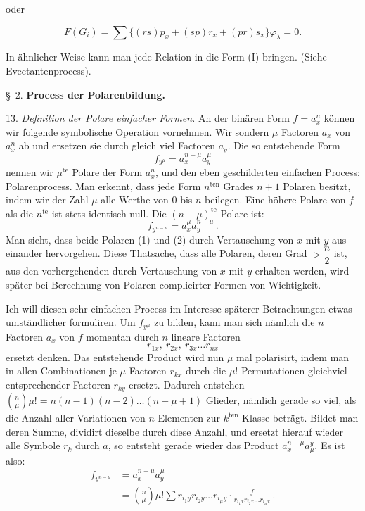 \documentclass[11pt]{article}
\providecommand{\weberpage}[1]{}
\providecommand{\weq}[2]{\begin{equation}\tag{#1}#2\end{equation}}
\begin{document}
oder

\weq{I}{F(G_i) = \sum \{(rs)p_x + (sp)r_x + (pr)s_x\}\varphi_\lambda = 0.}

In ähnlicher Weise kann man jede Relation in die Form (I) bringen.
(Siehe Evectantenprocess).


\weberpage{17}

\begin{center}
\S~2. \textbf{Process der Polarenbildung.}
\end{center}

13. \textit{Definition der Polare einfacher Formen.} An der binären Form $f=a_x^n$ können wir folgende symbolische Operation vornehmen. Wir sondern $\mu$ Factoren $a_x$ von $a_x^n$ ab und ersetzen sie durch gleich viel Factoren $a_y$. Die so entstehende Form
\weq{1}{f_{y^\mu} = a_x^{n-\mu}a_y^\mu}
nennen wir $\mu^{\text{te}}$ Polare der Form $a_x^n$, und den eben geschilderten einfachen Process: Polarenprocess. Man erkennt, dass jede Form $n^{\text{ten}}$ Grades $n+1$ Polaren besitzt, indem wir der Zahl $\mu$ alle Werthe von 0 bis $n$ beilegen. Eine höhere Polare von $f$ als die $n^{\text{te}}$ ist stets identisch null. Die $(n-\mu)^{\text{te}}$ Polare ist:
\weq{2}{f_{y^{n-\mu}} = a_x^\mu a_y^{n-\mu}\,.}
Man sieht, dass beide Polaren (1) und (2) durch Vertauschung von $x$ mit $y$ aus einander hervorgehen. Diese Thatsache, dass alle Polaren, deren Grad $>\dfrac{n}{2}$ ist, aus den vorhergehenden durch Vertauschung von $x$ mit $y$ erhalten werden, wird später bei Berechnung von Polaren complicirter Formen von Wichtigkeit.

Ich will diesen sehr einfachen Process im Interesse späterer Betrachtungen etwas umständlicher formuliren. Um $f_{y^\mu}$ zu bilden, kann man sich nämlich die $n$ Factoren $a_x$ von $f$ momentan durch $n$ lineare Factoren
\[ r_{1x},\ r_{2x},\ r_{3x}\ldots r_{nx} \]
ersetzt denken. Das entstehende Product wird nun $\mu$ mal polarisirt, indem man in allen Combinationen je $\mu$ Factoren $r_{kx}$ durch die $\mu!$ Permutationen gleichviel entsprechender Factoren $r_{ky}$ ersetzt. Dadurch entstehen $\binom{n}{\mu}\mu! = n(n-1)(n-2)\ldots(n-\mu+1)$ Glieder, nämlich gerade so viel, als die Anzahl aller Variationen von $n$ Elementen zur $k^{\text{ten}}$ Klasse beträgt. Bildet man deren Summe, dividirt dieselbe durch diese Anzahl, und ersetzt hierauf wieder alle Symbole $r_k$ durch $a$, so entsteht gerade wieder das Product $a_x^{n-\mu}a_\mu^y$. Es ist also: %
\[
\begin{aligned}
f_{y^{n-\mu}} &= a_x^{n-\mu}a_y^\mu\\
&= \binom{n}{\mu}\mu!\sum r_{i_1y}r_{i_2y}\ldots r_{i_\mu y}\cdot\frac{f}{r_{i_1x}r_{i_2x}\ldots r_{i_\mu x}}\,.
\end{aligned}
\]
\end{document}
